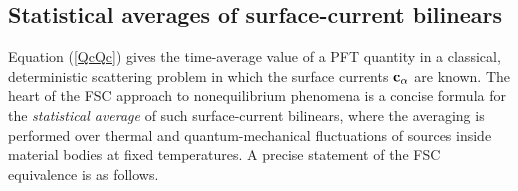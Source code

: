 \documentclass[letterpaper]{article}
\begin{document}
\subsection{Statistical averages of surface-current bilinears}

Equation (\ref{QcQc}) gives the time-average value of
a PFT quantity in a classical, deterministic scattering 
problem in which the surface currents $\mathbf{c}_\alpha$ are known.
The heart of the FSC approach to nonequilibrium phenomena 
is a concise formula for the \textit{statistical average} 
of such surface-current bilinears,
where the averaging is performed over thermal and quantum-mechanical
fluctuations of sources inside material bodies at fixed temperatures.
A precise statement of the FSC equivalence is as follows.
\end{document}
